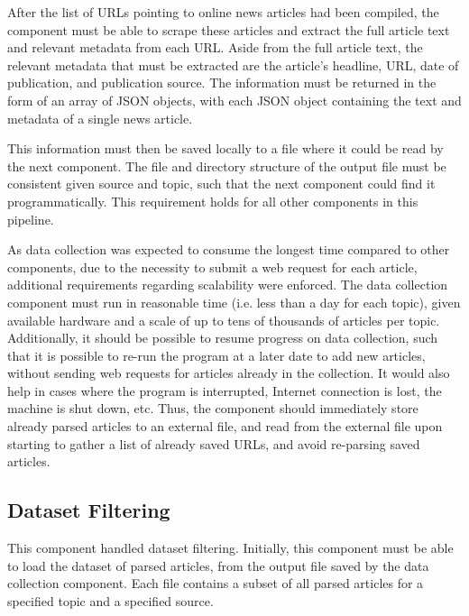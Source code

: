 \documentclass{report}
\begin{document}
After the list of URLs pointing to online news articles had been compiled, the component must be able to scrape these articles and extract the full article text and relevant metadata from each URL.
Aside from the full article text, the relevant metadata that must be extracted are the article's headline, URL, date of publication, and publication source.
The information must be returned in the form of an array of JSON objects, with each JSON object containing the text and metadata of a single news article.

This information must then be saved locally to a file where it could be read by the next component. 
The file and directory structure of the output file must be consistent given source and topic, such that the next component could find it programmatically.
This requirement holds for all other components in this pipeline.

As data collection was expected to consume the longest time compared to other components, due to the necessity to submit a web request for each article, additional requirements regarding scalability were enforced.
The data collection component must run in reasonable time (i.e. less than a day for each topic), given available hardware and a scale of up to tens of thousands of articles per topic.
Additionally, it should be possible to resume progress on data collection, such that it is possible to re-run the program at a later date to add new articles, without sending web requests for articles already in the collection.
It would also help in cases where the program is interrupted, Internet connection is lost, the machine is shut down, etc.
Thus, the component should immediately store already parsed articles to an external file, and read from the external file upon starting to gather a list of already saved URLs, and avoid re-parsing saved articles.

\subsection{Dataset Filtering} \label{req-filtering}

This component handled dataset filtering.
Initially, this component must be able to load the dataset of parsed articles, from the output file saved by the data collection component.
Each file contains a subset of all parsed articles for a specified topic and a specified source.
\end{document}
